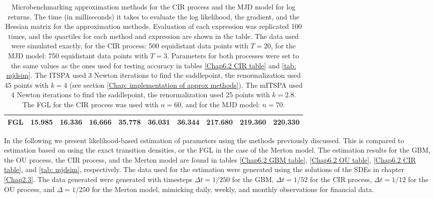 \begin{table}
{\begin{tabular}{@{}lrrrrrrrrr@{}}
			\textbf{FGL} &  15.985 &16.336 &16.666 & 35.778 & 36.031 &36.344 & 217.680 &219.360 &220.330         \\
			
			\bottomrule
		\end{tabular}}
		\caption[Microbenchmarking approximation methods] {Microbenchmarking approximation methods for the CIR process and the MJD model for log returns.
			The time (in milliseconds) it takes to evaluate the log likelihood, the gradient, and the Hessian matrix for the approximation methods.
			Evaluation of each expression was replicated 100 times, and the quartiles for each method and expression are shown in the table.
			The data used were simulated exactly, for the CIR process: 500 equidistant data points with $T=20$,
			for the MJD model: 750 equidistant data points with $T=3$.
			Parameters for both processes were set to the same values as the ones used for testing accuracy in tables \ref{Chap6.2 CIR table} and \ref{tab: mjdsim}.
			The ITSPA used 3 Newton iterations to find the saddlepoint, the renormalization used 45 points with $k=4$ (see section \ref{Chap: implementation of approx methods}).
			The mITSPA used 4 Newton iterations to find the saddlepoint, the renormalization used 25 points with $k=2.8$.
			The FGL for the CIR process was used with $n=60$, and for the MJD model: $n=70$.
		}
		\label{tab: microbenchmark}
	\end{table}
	
	
	
	In the following we present likelihood-based estimation of parameters using the methods previously discussed.
	This is compared to estimation based on using the exact transition densities, or the FGL in the case of the Merton model.
	The estimation results for the GBM, the OU process, the CIR process, and the Merton model are found in tables 
	\ref{Chap6.2 GBM table}, \ref{Chap6.2 OU table}, \ref{Chap6.2 CIR table}, and \ref{tab: mjdsim}, respectively.
	The data used for the estimation were generated using the solutions of the SDEs in chapter 
	\ref{Chap2.3}.
	The data generated were generated with timesteps $\Delta t = 1/250$ for the GBM, $\Delta t = 1/52$ for the CIR process, $\Delta t = 1/12$ for the OU process, and $\Delta=1/250$ for the Merton model, mimicking daily, weekly, and monthly observations for financial data.
	
